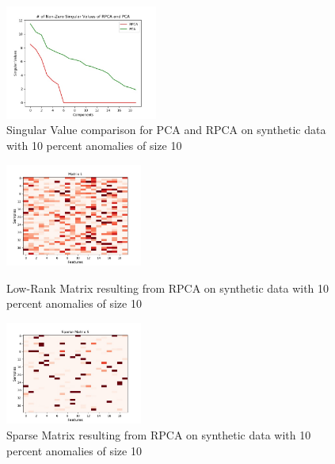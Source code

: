 \documentclass{article}
\begin{document}
\begin{figure}[H]
    \centering
    \includegraphics[width=50mm, scale=0.5]{Singular_Value_Plot_Test_400AnomSize10.jpg}
    \caption{Singular Value comparison for PCA and RPCA on synthetic data with 10 percent anomalies of size 10}
    \label{fig:singvaltrain40010}
\end{figure}
\begin{figure}[H]
\begin{minipage}[b]{0.45\linewidth}
    \centering
    \includegraphics[width=45mm, scale=0.5]{L_400AnomSize10.jpg}
    \caption{Low-Rank Matrix resulting from RPCA on synthetic data with 10 percent anomalies of size 10}
    \label{fig:Ltrain40010}
\end{minipage}
\quad
\begin{minipage}[b]{0.45\linewidth}
    \includegraphics[width=45mm, scale=0.5]{S_400AnomSize10.jpg}
    \caption{Sparse Matrix resulting from RPCA on synthetic data with 10 percent anomalies of size 10}
    \label{fig:Strain40010}
\end{minipage}
\end{figure}
\end{document}
